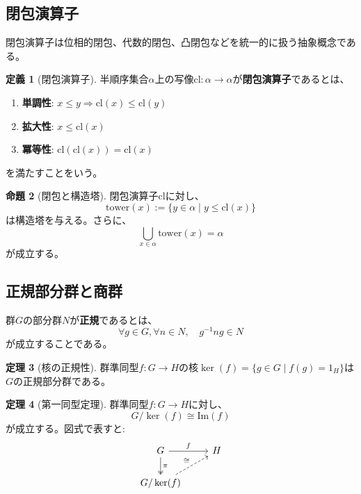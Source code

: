 \documentclass[a4paper,12pt]{ltjsarticle}
\theoremstyle{definition}
\newtheorem{theorem}{定理}[section]
\newtheorem{proposition}[theorem]{命題}
\newtheorem{definition}[theorem]{定義}
\begin{document}
\subsection{閉包演算子}
閉包演算子は位相的閉包、代数的閉包、凸閉包などを統一的に扱う抽象概念である。

\begin{definition}[閉包演算子]\label{def:closure-operator}
半順序集合$\alpha$上の写像$\text{cl}: \alpha \to \alpha$が\textbf{閉包演算子}であるとは、
\begin{enumerate}
\item \textbf{単調性}: $x \le y \Rightarrow \text{cl}(x) \le \text{cl}(y)$
\item \textbf{拡大性}: $x \le \text{cl}(x)$
\item \textbf{冪等性}: $\text{cl}(\text{cl}(x)) = \text{cl}(x)$
\end{enumerate}
を満たすことをいう。
\end{definition}

\begin{proposition}[閉包と構造塔]\label{prop:closure-tower}
閉包演算子$\text{cl}$に対し、
\[
\text{tower}(x) := \{y \in \alpha \mid y \le \text{cl}(x)\}
\]
は構造塔を与える。さらに、
\[
\bigcup_{x \in \alpha} \text{tower}(x) = \alpha
\]
が成立する。
\end{proposition}

\subsection{正規部分群と商群}
群$G$の部分群$N$が\textbf{正規}であるとは、
\[
\forall g \in G, \forall n \in N, \quad g^{-1}ng \in N
\]
が成立することである。

\begin{theorem}[核の正規性]\label{thm:kernel-normal}
群準同型$f: G \to H$の核$\ker(f) = \{g \in G \mid f(g) = 1_H\}$は$G$の正規部分群である。
\end{theorem}

\begin{theorem}[第一同型定理]\label{thm:first-isomorphism}
群準同型$f: G \to H$に対し、
\[
G / \ker(f) \cong \text{Im}(f)
\]
が成立する。図式で表すと:
\begin{equation*}
\begin{tikzcd}
G \arrow[r, "f"] \arrow[d, two heads, "\pi"] & H \\
G/\ker(f) \arrow[ur, dashed, "\cong"] &
\end{tikzcd}
\end{equation*}
\end{theorem}
\end{document}
